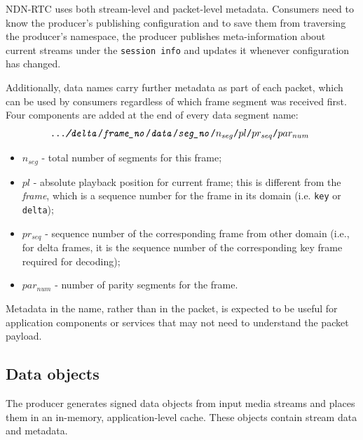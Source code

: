 \documentclass{icn/sig-alternate-2013} %
\newcommand{\ndnrtcName}{NDN-RTC} %
\begin{document}
\ndnrtcName{} uses both stream-level and packet-level metadata. 
Consumers need to know the producer's publishing configuration and to save them from traversing the producer's namespace, the producer publishes meta-information about current streams under the \texttt{session info} and updates it whenever configuration has changed.

Additionally, data names carry further metadata as part of each packet, which can be used by consumers regardless of which frame segment was received first. 
Four components are added at the end of every data segment name:
\small\begin{equation}
\texttt{\textit{.../delta}/\textit{frame\_no}/\textit{data}/\textit{seg\_no}/\textbf{$n_{seg}$}/\textbf{$pl$}/\textbf{$pr_{seq}$}/\textbf{$par_{num}$} \nonumber}
\end{equation}\normalsize
\begin{itemize}[label={}]
\item \texttt{$n_{seg}$} - total number of segments for this frame;
\item \texttt{$pl$} - absolute playback position for current frame; this is different from the \textit{frame}, which is a sequence number for the frame in its domain (i.e. \texttt{key} or \texttt{delta});
\item \texttt{$pr_{seq}$} - sequence number of the corresponding frame from other domain (i.e., for delta frames, it is the sequence number of the corresponding key frame required for decoding);
\item \texttt{$par_{num}$} - number of parity segments for the frame.
\end{itemize}
Metadata in the name, rather than in the packet, is expected to be useful for application components or services that may not need to understand the packet payload. 

\subsection{Data objects}
The producer generates signed data objects from input media streams and places them in an in-memory, application-level cache.  These objects contain stream data and metadata.
\end{document}
